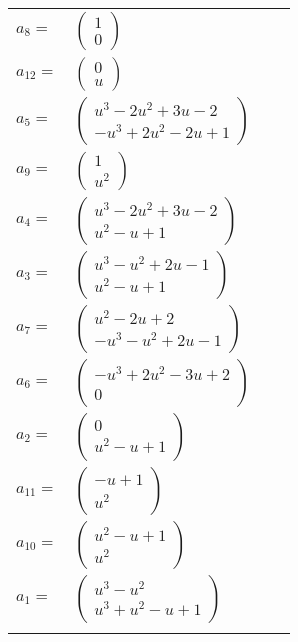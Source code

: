 \documentclass[1p]{elsarticle_modified}
\theoremstyle{definition}
\begin{document}
\begin{tabular}{m{7pt} m{180pt} m{7pt} m{180pt} }
\flushright $a_{8}=$&$\begin{pmatrix}1\\0\end{pmatrix}$ \\
\flushright $a_{12}=$&$\begin{pmatrix}0\\u\end{pmatrix}$ \\
\flushright $a_{5}=$&$\begin{pmatrix}u^3-2 u^2+3 u-2\\- u^3+2 u^2-2 u+1\end{pmatrix}$ \\
\flushright $a_{9}=$&$\begin{pmatrix}1\\u^2\end{pmatrix}$ \\
\flushright $a_{4}=$&$\begin{pmatrix}u^3-2 u^2+3 u-2\\u^2- u+1\end{pmatrix}$ \\
\flushright $a_{3}=$&$\begin{pmatrix}u^3- u^2+2 u-1\\u^2- u+1\end{pmatrix}$ \\
\flushright $a_{7}=$&$\begin{pmatrix}u^2-2 u+2\\- u^3- u^2+2 u-1\end{pmatrix}$ \\
\flushright $a_{6}=$&$\begin{pmatrix}- u^3+2 u^2-3 u+2\\0\end{pmatrix}$ \\
\flushright $a_{2}=$&$\begin{pmatrix}0\\u^2- u+1\end{pmatrix}$ \\
\flushright $a_{11}=$&$\begin{pmatrix}- u+1\\u^2\end{pmatrix}$ \\
\flushright $a_{10}=$&$\begin{pmatrix}u^2- u+1\\u^2\end{pmatrix}$ \\
\flushright $a_{1}=$&$\begin{pmatrix}u^3- u^2\\u^3+u^2- u+1\end{pmatrix}$\\&\end{tabular}
\end{document}
